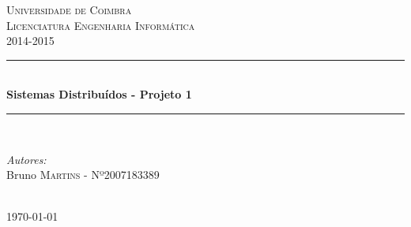 \documentclass[12pt]{article} %
\begin{document}

\begin{titlepage}

\newcommand{\HRule}{\rule{\linewidth}{0.5mm}} %

\center %

\textsc{\LARGE Universidade de Coimbra}\\[1.5cm] %
\textsc{\Large Licenciatura Engenharia Informática\\2014-2015}\\[0.5cm] %

\HRule \\[0.4cm]
{\huge \bfseries Sistemas Distribuídos - Projeto 1}\\[0.4cm] %
\HRule \\[1.5cm]

\begin{minipage}{0.8\textwidth}

\begin{flushleft} \large
\emph{Autores:}\\
Bruno \textsc{Martins} - Nº2007183389
\end{flushleft}

\end{minipage}

\begin{minipage}{0.4\textwidth}
\begin{flushright} \large
\end{flushright}
\end{minipage}\\[4cm]

{\large \today}\\[3cm] %
\vfill %

\end{titlepage}

\tableofcontents %
\end{document}
